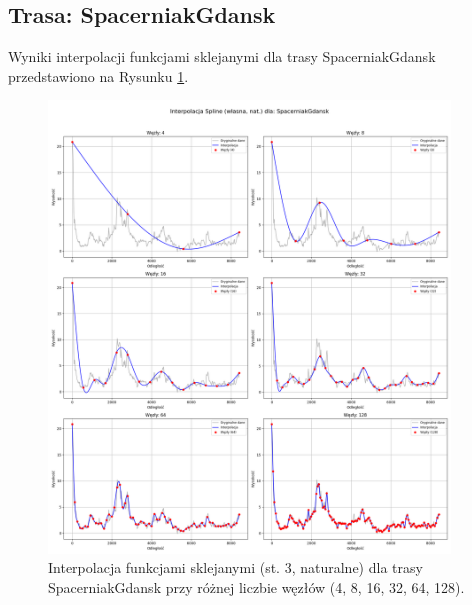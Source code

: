 \documentclass[11pt,a4paper]{article}
\begin{document}
\subsection{Trasa: SpacerniakGdansk}
Wyniki interpolacji funkcjami sklejanymi dla trasy SpacerniakGdansk przedstawiono na Rysunku \ref{fig:spline_spacerniak}.

\begin{figure}[H]
    \centering
    \includegraphics[width=0.95\textwidth]{SpacerniakGdansk_Spline_basic_subplots.png} %
    \caption{Interpolacja funkcjami sklejanymi (st. 3, naturalne) dla trasy SpacerniakGdansk przy różnej liczbie węzłów (4, 8, 16, 32, 64, 128).}
    \label{fig:spline_spacerniak}
\end{figure}
\end{document}
